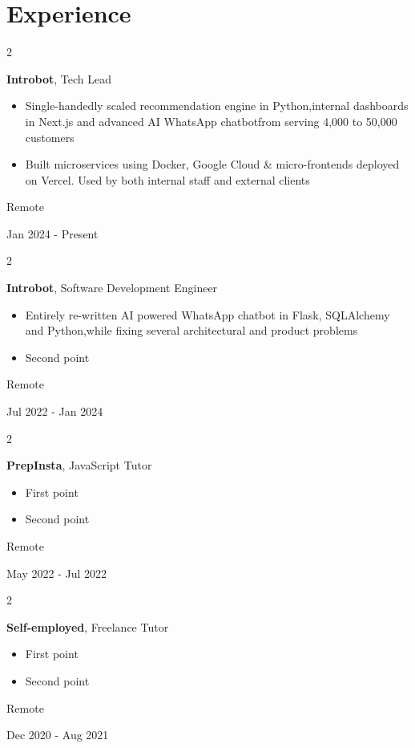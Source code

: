 \documentclass[10pt, letterpaper]{article}
\newenvironment{highlights}{
    \begin{itemize}[
        topsep=0.10 cm,
        parsep=0.10 cm,
        partopsep=0pt,
        itemsep=0pt,
        leftmargin=0.4 cm + 10pt
    ]
}{
    \end{itemize}
} %
\newenvironment{twocolentry}[2][]{
    \onecolentry
    \def\secondColumn{#2}
    \setcolumnwidth{\fill, 4.5 cm}
    \begin{paracol}{2}
}{
    \switchcolumn \raggedleft \secondColumn
    \end{paracol}
    \endonecolentry
} %
\begin{document}
    \section{Experience}
        \begin{twocolentry}{
            Remote

        Jan 2024 - Present
        }
            \textbf{Introbot}, Tech Lead
            \begin{highlights}
                \item Single-handedly scaled recommendation engine in Python,\newline internal dashboards in Next.js and advanced AI WhatsApp chatbot\newline from serving 4,000 to 50,000 customers
                \item Built microservices using Docker, Google Cloud \& micro-frontends deployed on Vercel. Used by both internal staff and external clients
            \end{highlights}
        \end{twocolentry}
        \vspace{0.2 cm}
        \begin{twocolentry}{
            Remote

        Jul 2022 - Jan 2024
        }
            \textbf{Introbot}, Software Development Engineer
            \begin{highlights}
                \item Entirely re-written AI powered WhatsApp chatbot in Flask, SQLAlchemy and Python,\newline while fixing several architectural and product problems
                \item Second point
            \end{highlights}
        \end{twocolentry}
        \vspace{0.2 cm}
        \begin{twocolentry}{
            Remote

        May 2022 - Jul 2022
        }
            \textbf{PrepInsta}, JavaScript Tutor
            \begin{highlights}
                \item First point
                \item Second point
            \end{highlights}
        \end{twocolentry}
        \vspace{0.2 cm}
        \begin{twocolentry}{
            Remote

        Dec 2020 - Aug 2021
        }
            \textbf{Self-employed}, Freelance Tutor
            \begin{highlights}
                \item First point
                \item Second point
            \end{highlights}
        \end{twocolentry}
\end{document}
